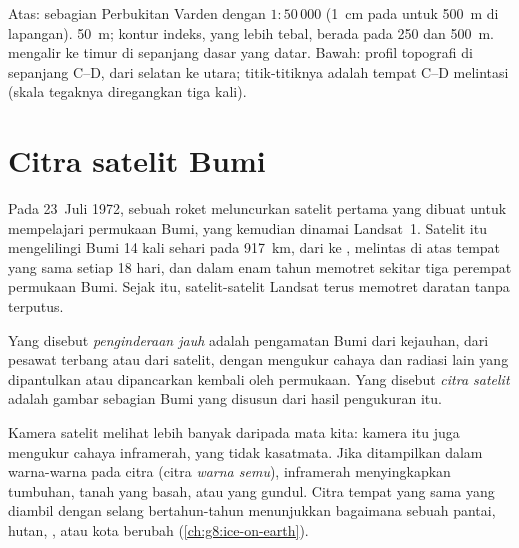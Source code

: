 \begin{omfigure}
{\small Atas:  sebagian Perbukitan Varden dengan 
$1 : 50\,000$ (1~cm pada  untuk \qty{500}{m} di lapangan).  \qty{50}{m}; kontur indeks, yang lebih tebal, berada pada 250 dan
\qty{500}{m}.  mengalir ke timur di sepanjang dasar  yang
datar. Bawah: profil topografi di sepanjang C--D, dari selatan ke utara;
titik-titiknya adalah tempat C--D melintasi  (skala tegaknya
diregangkan tiga kali).}
\label{fig:g9:maps-of-the-earth:topo}
\end{omfigure}

\section{Citra satelit Bumi}

Pada 23~Juli 1972, sebuah roket meluncurkan satelit pertama yang dibuat
untuk mempelajari permukaan Bumi, yang kemudian dinamai Landsat~1. Satelit
itu mengelilingi Bumi 14 kali sehari pada  \qty{917}{km}, dari
 ke , melintas di atas tempat yang sama setiap 18 hari, dan
dalam enam tahun memotret sekitar tiga perempat permukaan Bumi. Sejak itu,
satelit-satelit Landsat terus memotret daratan tanpa terputus.

\begin{definition}\label{def:g9:maps-of-the-earth:remote-sensing}
Yang disebut \emph{penginderaan jauh} adalah
pengamatan Bumi dari kejauhan, dari pesawat terbang atau dari satelit,
dengan mengukur cahaya dan radiasi lain yang dipantulkan atau dipancarkan
kembali oleh permukaan. Yang disebut \emph{citra
satelit} adalah gambar sebagian Bumi yang disusun dari hasil pengukuran
itu.
\end{definition}

Kamera satelit melihat lebih banyak daripada mata kita: kamera itu juga
mengukur cahaya inframerah, yang tidak kasatmata. Jika ditampilkan dalam
warna-warna pada citra (citra \emph{warna semu}), inframerah menyingkapkan
tumbuhan, tanah yang basah, atau  yang gundul. Citra tempat yang
sama yang diambil dengan selang bertahun-tahun menunjukkan bagaimana
sebuah pantai, hutan, , atau kota berubah (\cref{ch:g8:ice-on-earth}).

